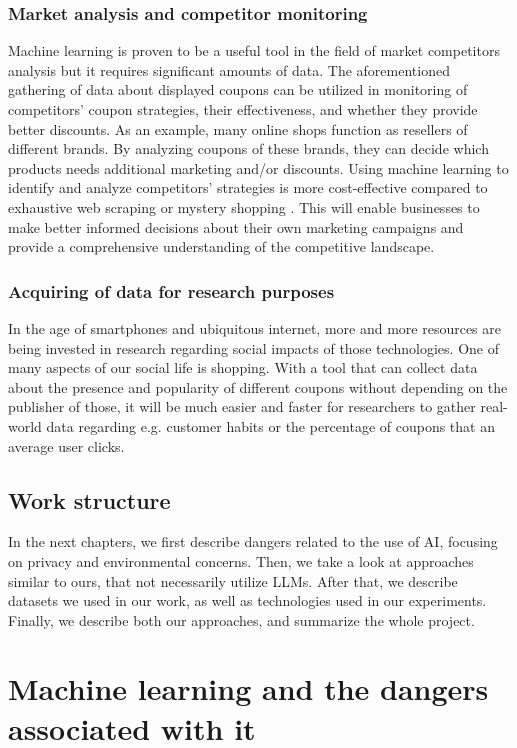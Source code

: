 \documentclass[licencjacka,en]{pracamgr}
\begin{document}
\subsection{Market analysis and competitor monitoring}
Machine learning is proven to be a useful tool in the field of market competitors analysis but it requires significant amounts of data\cite{competitor_tariffs}.
The aforementioned gathering of data about displayed coupons can be utilized in monitoring of competitors' coupon strategies, their effectiveness, and whether they provide better discounts. As an example, many online shops function as resellers of different brands. By analyzing coupons of these brands, they can decide which products needs additional marketing and/or discounts. Using machine learning to identify and analyze competitors' strategies is more cost-effective compared to exhaustive web scraping or mystery shopping \cite{competitor_tariffs}. This will enable businesses to make better informed decisions about their own marketing campaigns and provide a comprehensive understanding of the competitive landscape.

\subsection{Acquiring of data for research purposes}
In the age of smartphones and ubiquitous internet, more and more resources are being invested in research regarding social impacts of those technologies. One of many aspects of our social life is shopping. With a tool that can collect data about the presence and popularity of different coupons without depending on the publisher of those, it will be much easier and faster for researchers to gather real-world data regarding e.g. customer habits or the percentage of coupons that an average user clicks.

\section{Work structure}
In the next chapters, we first describe dangers related to the use of AI, focusing on privacy and environmental concerns. Then, we take a look at approaches similar to ours, that not necessarily utilize LLMs. After that, we describe datasets we used in our work, as well as technologies used in our experiments. Finally, we describe both our approaches, and summarize the whole project.

\chapter{Machine learning and the dangers associated with it}
\end{document}
